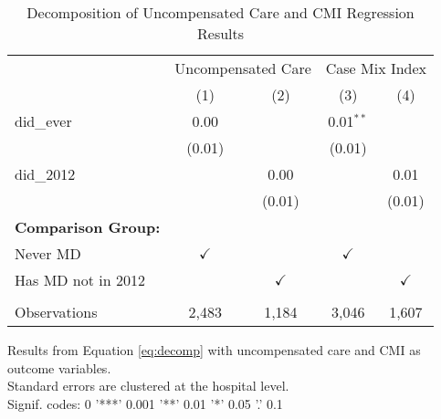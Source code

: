 \begin{table}[ht!]
   \caption{\label{tab:MD_noMD_uncompCMI_decomp_fullsample} Decomposition of Uncompensated Care and CMI Regression Results}
   \bigskip
   \centering
   \begin{tabular}{lcccc}
      \toprule
       & \multicolumn{2}{c}{Uncompensated Care} & \multicolumn{2}{c}{Case Mix Index}\\
                                  & (1)           & (2)           & (3)           & (4)\\  
      \midrule 
      did\_ever                   & 0.00          &               & 0.01$^{**}$   &   \\   
                                  & (0.01)        &               & (0.01)        &   \\   
      did\_2012                   &               & 0.00          &               & 0.01\\   
                                  &               & (0.01)        &               & (0.01)\\   
      \textbf{Comparison Group:}  &               &               &               & \\  
      Never MD                    & $\checkmark$  &               & $\checkmark$  &  \\  
      Has MD not in 2012          &               & $\checkmark$  &               & $\checkmark$\\   
       \\
      Observations                & 2,483         & 1,184         & 3,046         & 1,607\\  
      \bottomrule
   \end{tabular}
   
   \par \raggedright 
   Results from Equation \ref{eq:decomp} with uncompensated care and CMI as outcome variables.\\
   Standard errors are clustered at the hospital level.\\
   Signif. codes: 0 '***' 0.001 '**' 0.01 '*' 0.05 '.' 0.1
\end{table}
